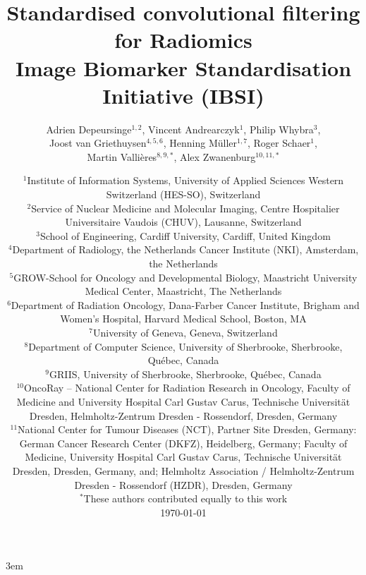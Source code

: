 \documentclass[fleqn,a4paper,oneside,openany]{book}
\begin{document}
\emergencystretch 3em
\renewcommand{\tablename}{Table}

\frontmatter
\title{Standardised convolutional filtering for Radiomics\\
\vspace{2mm}
\large Image Biomarker Standardisation Initiative (IBSI) \\
\vspace{10mm}}
\author{Adrien Depeursinge$^{1,2}$, 
Vincent Andrearczyk$^1$, 
Philip Whybra$^3$,\\
Joost van Griethuysen$^{4,5,6}$,
Henning M\"{u}ller$^{1,7}$, 
Roger Schaer$^1$,\\
Martin Valli\`{e}res$^{8,9,*}$,
Alex Zwanenburg$^{10,11,*}$}
\date{
\small
$^1$Institute of Information Systems, University of Applied Sciences Western Switzerland (HES-SO), Switzerland\\
$^2$Service of Nuclear Medicine and Molecular Imaging, Centre Hospitalier Universitaire Vaudois (CHUV), Lausanne, Switzerland\\
$^3$School of Engineering, Cardiff University, Cardiff, United Kingdom\\
$^4$Department of Radiology, the Netherlands Cancer Institute (NKI), Amsterdam, the Netherlands\\
$^5$GROW-School for Oncology and Developmental Biology, Maastricht University Medical Center, Maastricht, The Netherlands\\
$^6$Department of Radiation Oncology, Dana-Farber Cancer Institute, Brigham and Women’s Hospital, Harvard Medical School, Boston, MA\\
$^{7}$University of Geneva, Geneva, Switzerland\\
$^8$Department of Computer Science, University of Sherbrooke, Sherbrooke, Qu\'{e}bec, Canada\\
$^9$GRIIS, University of Sherbrooke, Sherbrooke, Qu\'{e}bec, Canada\\
$^{10}$OncoRay -- National Center for Radiation Research in Oncology, Faculty of Medicine and University Hospital Carl Gustav Carus, Technische Universität Dresden, Helmholtz-Zentrum Dresden - Rossendorf, Dresden, Germany\\
$^{11}$National Center for Tumour Diseases (NCT), Partner Site Dresden, Germany: German Cancer Research Center (DKFZ), Heidelberg, Germany; Faculty of Medicine, University Hospital Carl Gustav Carus, Technische Universität Dresden, Dresden, Germany, and; Helmholtz Association / Helmholtz-Zentrum Dresden - Rossendorf (HZDR), Dresden, Germany\\
\vspace{5mm}
$^{*}$These authors contributed equally to this work\\
\vspace{10mm}
\large
\today
}
\maketitle
\end{document}
